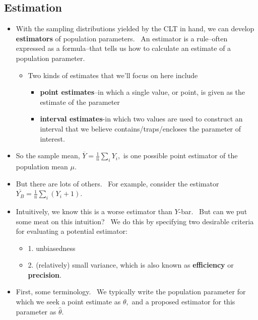 \documentclass[11pt]{article}
\begin{document}
\subsection{Estimation}

\begin{itemize}
\item With the sampling distributions yielded by the CLT in hand, we can
develop \textbf{estimators }of population parameters. \ An estimator is a
rule--often expressed as a formula--that tells us how to calculate an
estimate of a population parameter. \ 

\begin{itemize}
\item Two kinds of estimates that we'll focus on here include

\begin{itemize}
\item \textbf{point estimates}--in which a single value, or point, is given
as the estimate of the parameter

\item \textbf{interval estimates}-in which two values are used to construct
an interval that we believe contains/traps/encloses the parameter of
interest.
\end{itemize}
\end{itemize}

\item So the sample mean, $\overline{Y}=\frac{1}{n}\sum_{i}Y_{i},$ is one
possible point estimator of the population mean $\mu .$

\item But there are lots of others. \ For example, consider the estimator $%
\overline{Y_{B}}=\frac{1}{n}\sum_{i}(Y_{i}+1).$ \ 

\item Intuitively, we know this is a worse estimator than $Y$-bar. \ But can
we put some meat on this intuition? \ We do this by specifying two desirable
criteria for evaluating a potential estimator:

\begin{itemize}
\item 1. unbiasedness

\item 2. (relatively) small variance, which is also known as \textbf{%
efficiency} or \textbf{precision}.
\end{itemize}

\item First, some terminology. \ We typically write the population parameter
for which we seek a point estimate as $\theta ,$ and a proposed estimator
for this parameter as $\widehat{\theta }.$ \ 


\end{itemize}
\end{document}
